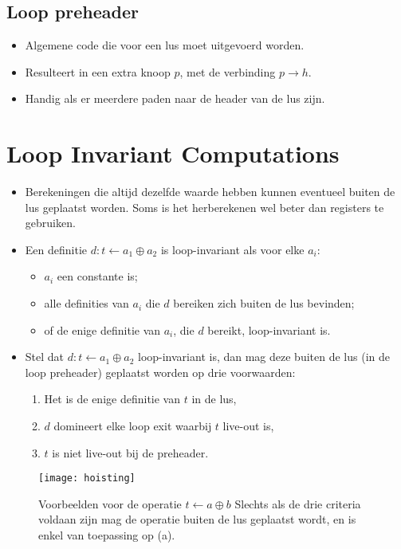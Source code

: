 \subsection{Loop preheader}
\begin{itemize}
	\item Algemene code die voor een lus moet uitgevoerd worden.
	\item Resulteert in een extra knoop $p$, met de verbinding $p \rightarrow h$.
	\item Handig als er meerdere paden naar de header van de lus zijn.
\end{itemize}



\section{Loop Invariant Computations}
\begin{itemize}
	\item Berekeningen die altijd dezelfde waarde hebben kunnen eventueel buiten de lus geplaatst worden. 
	\alert Soms is het herberekenen wel beter dan registers te gebruiken.
	\item Een definitie $d : t \leftarrow a_1 \oplus a_2$ is loop-invariant als voor elke $a_i$:
	\begin{itemize}
		\item $a_i$ een constante is;
		\item alle definities van $a_i$ die $d$ bereiken zich buiten de lus bevinden;
		\item of de enige definitie van $a_i$, die $d$ bereikt, loop-invariant is.
	\end{itemize}
	\item Stel dat $d : t \leftarrow a_1 \oplus a_2$ loop-invariant is, dan mag deze buiten de lus (in de loop preheader) geplaatst worden op drie voorwaarden:
	\begin{enumerate}
		\item Het is de enige definitie van $t$ in de lus,
		\item $d$ domineert elke loop exit waarbij $t$ live-out is,
		\item $t$ is niet live-out bij de preheader.
	\end{enumerate}
\end{itemize}

\begin{figure}[ht]
	\centering
	\texttt{[image: hoisting]}
	\caption{Voorbeelden voor de operatie $t \leftarrow a \oplus b$ Slechts als de drie criteria voldaan zijn mag de operatie buiten de lus geplaatst wordt, en is enkel van toepassing op (a).}
	\label{fig:hoisting}
\end{figure}

